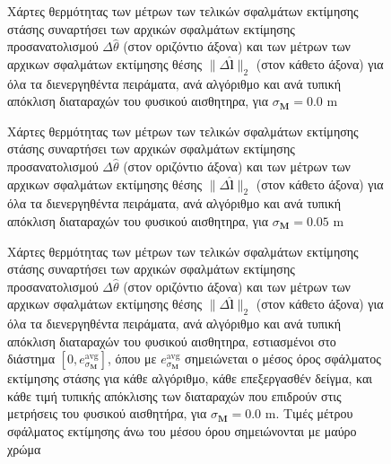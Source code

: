 \begin{figure}[!h]\vspace{1cm}\hspace{0.5cm}
  
  \vspace{1cm}
  \caption{\small Χάρτες θερμότητας των μέτρων των τελικών σφαλμάτων εκτίμησης
           στάσης συναρτήσει των αρχικών σφαλμάτων εκτίμησης προσανατολισμού
           $\Delta\hat{\theta}$ (στον οριζόντιο άξονα) και των μέτρων των
           αρχικων σφαλμάτων εκτίμησης θέσης $\|\Delta \hat{\bm{l}}\|_2$ (στον
           κάθετο άξονα) για όλα τα διενεργηθέντα πειράματα, ανά αλγόριθμο και
           ανά τυπική απόκλιση διαταραχών του φυσικού αισθητηρα, για
           $\sigma_{\bm{M}} = 0.0$ m}
  \label{fig:02_04_05:06}
\end{figure}

\begin{figure}[!h]\vspace{1cm}\hspace{0.5cm}
  
  \vspace{1cm}
  \caption{\small Χάρτες θερμότητας των μέτρων των τελικών σφαλμάτων εκτίμησης
           στάσης συναρτήσει των αρχικών σφαλμάτων εκτίμησης προσανατολισμού
           $\Delta\hat{\theta}$ (στον οριζόντιο άξονα) και των μέτρων των
           αρχικων σφαλμάτων εκτίμησης θέσης $\|\Delta \hat{\bm{l}}\|_2$ (στον
           κάθετο άξονα) για όλα τα διενεργηθέντα πειράματα, ανά αλγόριθμο και
           ανά τυπική απόκλιση διαταραχών του φυσικού αισθητηρα, για
           $\sigma_{\bm{M}} = 0.05$ m}
  \label{fig:02_04_05:07}
\end{figure}

\begin{figure}[!h]\vspace{2cm}\hspace{0.5cm}
  
  \vspace{1cm}
  \caption{\small Χάρτες θερμότητας των μέτρων των τελικών σφαλμάτων εκτίμησης
           στάσης συναρτήσει των αρχικών σφαλμάτων εκτίμησης προσανατολισμού
           $\Delta\hat{\theta}$ (στον οριζόντιο άξονα) και των μέτρων των
           αρχικων σφαλμάτων εκτίμησης θέσης $\|\Delta \hat{\bm{l}}\|_2$ (στον
           κάθετο άξονα) για όλα τα διενεργηθέντα πειράματα, ανά αλγόριθμο και
           ανά τυπική απόκλιση διαταραχών του φυσικού αισθητηρα, εστιασμένοι
           στο διάστημα $[0, e_{\sigma_{\bm{M}}}^{\text{avg}}]$, όπου με
           $e_{\sigma_{\bm{M}}}^{\text{avg}}$ σημειώνεται ο μέσος όρος
           σφάλματος εκτίμησης στάσης για κάθε αλγόριθμο, κάθε επεξεργασθέν
           δείγμα, και κάθε τιμή τυπικής απόκλισης των διαταραχών που επιδρούν
           στις μετρήσεις του φυσικού αισθητήρα, για $\sigma_{\bm{M}} = 0.0$ m.
           Τιμές μέτρου σφάλματος εκτίμησης άνω του μέσου όρου σημειώνονται με
           μαύρο χρώμα}
  \label{fig:02_04_05:08}
\end{figure}

